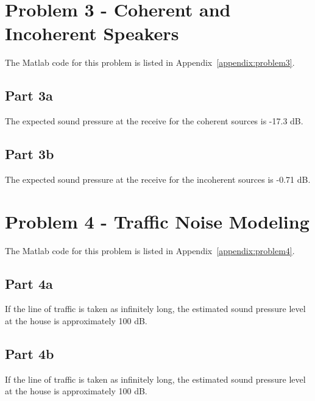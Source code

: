 \documentclass[letter, 10pt, margins=0.3in]{texMemo}
\begin{document}
{\section*{Problem 3 - Coherent and Incoherent Speakers}
\setcounter{figure}{0}
\setcounter{table}{0}
\setcounter{footnote}{0}


The Matlab code for this problem is listed in Appendix~\ref{appendix:problem3}.


\subsection*{Part 3a}

The expected sound pressure at the receive for the coherent sources is -17.3 dB.



\subsection*{Part 3b}

The expected sound pressure at the receive for the incoherent sources is -0.71 dB.






\vspace{4cm}
\section*{Problem 4 - Traffic Noise Modeling}
\setcounter{figure}{0}
\setcounter{table}{0}
\setcounter{footnote}{0}


The Matlab code for this problem is listed in Appendix~\ref{appendix:problem4}.


\subsection*{Part 4a}

If the line of traffic is taken as infinitely long, the estimated sound pressure level at the house is approximately 100 dB.



\subsection*{Part 4b}

If the line of traffic is taken as infinitely long, the estimated sound pressure level at the house is approximately 100 dB.










}
\end{document}
